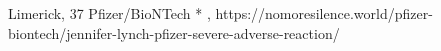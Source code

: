           {Limerick, }
          {37}
          {Pfizer/BioNTech}
          {*}
          {
            ,
          }
          {https://nomoresilence.world/pfizer-biontech/jennifer-lynch-pfizer-severe-adverse-reaction/}



